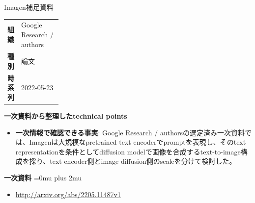 \begin{technicalnote}{Imagen}{補足資料}
\begingroup
\begin{tabularx}{\linewidth}{@{}>{\bfseries}p{0.22\linewidth}X@{}}
組織 & Google Research / authors \\
種別 & 論文 \\
時系列 & 2022-05-23 \\
\end{tabularx}
\smallskip
{\bfseries 一次資料から整理したtechnical points}
\begin{itemize}[leftmargin=1.5em,itemsep=0.35em]
\item \textbf{一次情報で確認できる事実}: Google Research / authorsの選定済み一次資料では、Imagenは大規模なpretrained text encoderでpromptを表現し、そのtext representationを条件としてdiffusion modelで画像を合成するtext-to-image構成を採り、text encoder側とimage diffusion側のscaleを分けて検討した。
\end{itemize}
\begin{minipage}{\linewidth}
\begin{samepage}
{\bfseries 一次資料}
\begingroup\sloppy
\Urlmuskip=0mu plus 2mu\relax
\begin{itemize}[leftmargin=1.5em,itemsep=0.25em]
\item {\scriptsize\url{http://arxiv.org/abs/2205.11487v1}}
\end{itemize}
\endgroup
\end{samepage}
\end{minipage}
\endgroup
\end{technicalnote}
\medskip

